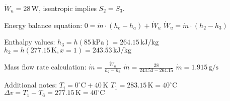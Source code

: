 \( \dot{W}_u = 28 \, \text{W} \), isentropic implies \( S_2 = S_3 \).  

Energy balance equation:  
\( 0 = \dot{m} \cdot (h_e - h_a) + \dot{W}_u \)  
\( \dot{W}_u = \dot{m} \cdot (h_2 - h_3) \)  

Enthalpy values:  
\( h_3 = h(85 \, \text{kPa}) = 264.15 \, \text{kJ/kg} \)  
\( h_2 = h(277.15 \, \text{K}, x = 1) = 243.53 \, \text{kJ/kg} \)  

Mass flow rate calculation:  
\( \dot{m} = \frac{\dot{W}_u}{h_2 - h_3} \)  
\( \dot{m} = \frac{28}{243.53 - 264.15} \)  
\( \dot{m} = 1.915 \, \text{g/s} \)  

Additional notes:  
\( T_i = 0^\circ \text{C} + 40 \, \text{K} \)  
\( T_1 = 283.15 \, \text{K} = 40^\circ \text{C} \)  
\( \Delta v = T_1 - T_6 = 277.15 \, \text{K} = 40^\circ \text{C} \)